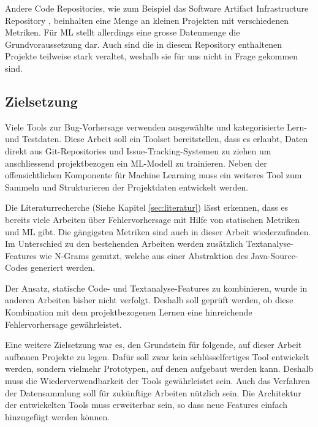 \documentclass[10pt, a4paper]{article}
\begin{document}
Andere Code Repositories, wie zum Beispiel das Software Artifact Infrastructure Repository \cite{softwareartifactinfrastructurerepo}, beinhalten eine Menge an kleinen Projekten mit verschiedenen Metriken. Für \ac{ML} stellt allerdings eine grosse Datenmenge die Grundvoraussetzung dar. Auch sind die in diesem Repository enthaltenen Projekte teilweise stark veraltet, weshalb sie für uns nicht in Frage gekommen sind.

\subsection{Zielsetzung}

Viele Tools zur Bug-Vorhersage verwenden ausgewählte und kategorisierte Lern- und Testdaten. Diese Arbeit soll ein Toolset bereitstellen, dass es erlaubt, Daten direkt aus Git-Repositories und Issue-Tracking-Systemen zu ziehen um anschliessend projektbezogen ein \ac{ML}-Modell zu trainieren. Neben der offensichtlichen Komponente für Machine Learning muss ein weiteres Tool zum Sammeln und Strukturieren der Projektdaten entwickelt werden.

Die Literaturrecherche (Siehe Kapitel \ref{sec:literatur}) lässt erkennen, dass es bereits viele Arbeiten über Fehlervorhersage mit Hilfe von statischen Metriken und \ac{ML} gibt. Die gängigsten Metriken sind auch in dieser Arbeit wiederzufinden. Im Unterschied zu den bestehenden Arbeiten werden zusätzlich Textanalyse-Features wie N-Grams genutzt, welche aus einer Abstraktion des Java-Source-Codes generiert werden.

Der Ansatz, statische Code- und Textanalyse-Features zu kombinieren, wurde in anderen Arbeiten bisher nicht verfolgt. Deshalb soll geprüft werden, ob diese Kombination mit dem projektbezogenen Lernen eine hinreichende Fehlervorhersage gewährleistet.

Eine weitere Zielsetzung war es, den Grundstein für folgende, auf dieser Arbeit aufbauen Projekte zu legen. Dafür soll zwar kein schlüsselfertiges Tool entwickelt werden, sondern vielmehr Prototypen, auf denen aufgebaut werden kann. Deshalb muss die Wiederverwendbarkeit der Tools gewährleistet sein. Auch das Verfahren der Datensammlung soll für zukünftige Arbeiten nützlich sein. Die Architektur der entwickelten Tools muss erweiterbar sein, so dass neue Features einfach hinzugefügt werden können.
\end{document}
